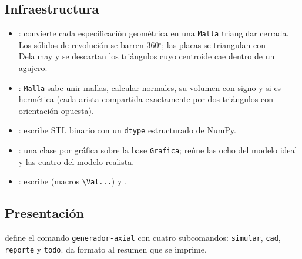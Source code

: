 \documentclass[11pt]{article}
\begin{document}
\subsection{Infraestructura}
\begin{itemize}
  \item {}: convierte cada especificación geométrica en una \texttt{Malla} triangular
        cerrada. Los sólidos de revolución se barren 360$^\circ$; las placas se triangulan con Delaunay y se
        descartan los triángulos cuyo centroide cae dentro de un agujero.
  \item {}: \texttt{Malla} sabe unir mallas, calcular normales, su volumen con signo y si es
        hermética (cada arista compartida exactamente por dos triángulos con orientación opuesta).
  \item {}: escribe STL binario con un \texttt{dtype} estructurado de NumPy.
  \item {}: una clase por gráfica sobre la base \texttt{Grafica};  reúne las
        ocho del modelo ideal y  las cuatro del modelo realista.
  \item {}: escribe  (macros \texttt{\textbackslash Val...}) y
        .
\end{itemize}

\subsection{Presentación}
 define el comando \texttt{generador-axial} con cuatro subcomandos: \texttt{simular},
\texttt{cad}, \texttt{reporte} y \texttt{todo}.  da formato al resumen que se imprime.

\end{document}
